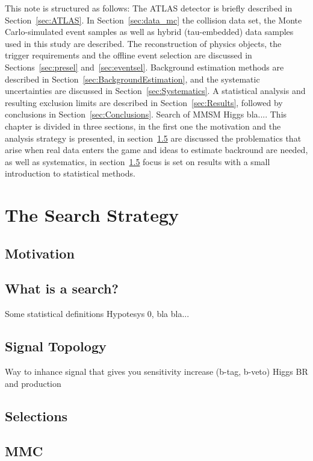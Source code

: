 This note is structured as follows: The ATLAS detector is briefly
described in Section~\ref{sec:ATLAS}. In Section~\ref{sec:data_mc} the
collision data set, the Monte Carlo-simulated event samples as well as
hybrid (tau-embedded) data samples used in this study are
described. The reconstruction of physics objects, the trigger
requirements and the offline event selection are discussed in
Sections~\ref{sec:presel} and~\ref{sec:eventsel}. Background estimation methods are
described in Section~\ref{sec:BackgroundEstimation}, and the
systematic uncertainties are discussed in
Section~\ref{sec:Systematics}. A statistical analysis and resulting
exclusion limits are described in Section~\ref{sec:Results}, followed
by conclusions in Section~\ref{sec:Conclusions}.
Search of MMSM Higgs bla....
This chapter is divided in three sections, in the first one the motivation and the 
analysis strategy is presented, in section~\ref{} are discussed the problematics 
that arise when real data enters the game and ideas to estimate backround are needed, 
as well as systematics, in section~\ref{}  focus is set on results with a small introduction to
statistical methods.

\section{The Search Strategy}


\subsection{Motivation}

\subsection{What is a search?} 
Some statistical definitions Hypotesys 0, bla bla...

\subsection{Signal Topology}
Way to inhance signal that gives you sensitivity increase (b-tag, b-veto)
Higgs BR and production
\subsection{Selections}

\subsection{MMC}



